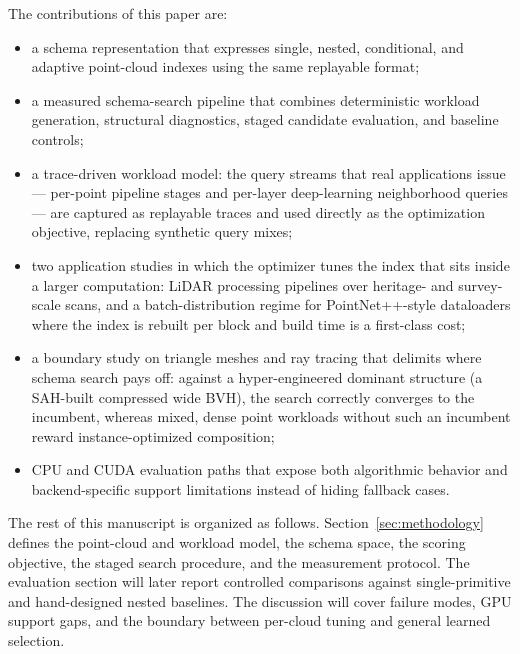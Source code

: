 The contributions of this paper are:
\begin{itemize}[leftmargin=*]
  \item a schema representation that expresses single, nested, conditional, and adaptive point-cloud indexes using the same replayable format;
  \item a measured schema-search pipeline that combines deterministic workload generation, structural diagnostics, staged candidate evaluation, and baseline controls;
  \item a trace-driven workload model: the query streams that real applications issue --- per-point pipeline stages and per-layer deep-learning neighborhood queries --- are captured as replayable traces and used directly as the optimization objective, replacing synthetic query mixes;
  \item two application studies in which the optimizer tunes the index that sits inside a larger computation: LiDAR processing pipelines over heritage- and survey-scale scans, and a batch-distribution regime for PointNet++-style dataloaders where the index is rebuilt per block and build time is a first-class cost;
  \item a boundary study on triangle meshes and ray tracing that delimits where schema search pays off: against a hyper-engineered dominant structure (a SAH-built compressed wide BVH), the search correctly converges to the incumbent, whereas mixed, dense point workloads without such an incumbent reward instance-optimized composition;
  \item CPU and CUDA evaluation paths that expose both algorithmic behavior and backend-specific support limitations instead of hiding fallback cases.
\end{itemize}

The rest of this manuscript is organized as follows. Section~\ref{sec:methodology} defines the point-cloud and workload model, the schema space, the scoring objective, the staged search procedure, and the measurement protocol. The evaluation section will later report controlled comparisons against single-primitive and hand-designed nested baselines. The discussion will cover failure modes, GPU support gaps, and the boundary between per-cloud tuning and general learned selection.
